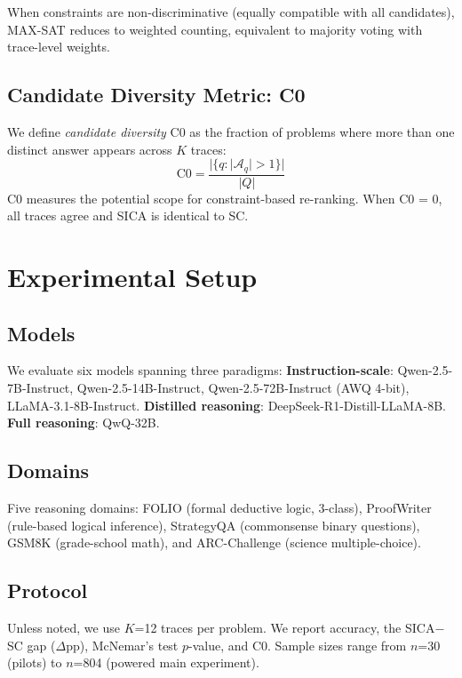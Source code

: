 \documentclass[11pt,a4paper]{article}
\begin{document}
When constraints are non-discriminative (equally compatible with all candidates), MAX-SAT reduces to weighted counting, equivalent to majority voting with trace-level weights.

\subsection{Candidate Diversity Metric: C0}

We define \emph{candidate diversity} C0 as the fraction of problems where more than one distinct answer appears across $K$ traces:
\[
    \text{C0} = \frac{|\{q : |\mathcal{A}_q| > 1\}|}{|Q|}
\]
C0 measures the potential scope for constraint-based re-ranking. When C0 = 0, all traces agree and SICA is identical to SC.

\section{Experimental Setup}

\subsection{Models}

We evaluate six models spanning three paradigms:
\textbf{Instruction-scale}: Qwen-2.5-7B-Instruct, Qwen-2.5-14B-Instruct, Qwen-2.5-72B-Instruct (AWQ 4-bit), LLaMA-3.1-8B-Instruct.
\textbf{Distilled reasoning}: DeepSeek-R1-Distill-LLaMA-8B.
\textbf{Full reasoning}: QwQ-32B.

\subsection{Domains}

Five reasoning domains: FOLIO (formal deductive logic, 3-class), ProofWriter (rule-based logical inference), StrategyQA (commonsense binary questions), GSM8K (grade-school math), and ARC-Challenge (science multiple-choice).

\subsection{Protocol}

Unless noted, we use $K$=12 traces per problem. We report accuracy, the SICA$-$SC gap ($\Delta$pp), McNemar's test $p$-value, and C0. Sample sizes range from $n$=30 (pilots) to $n$=804 (powered main experiment).
\end{document}
